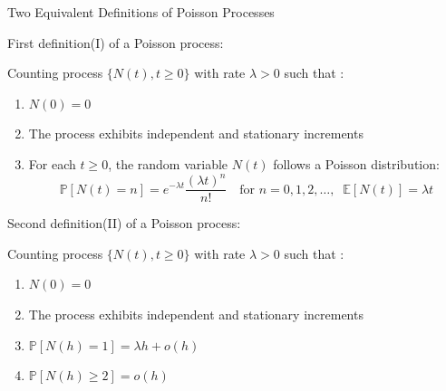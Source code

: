 \documentclass{beamer}
\begin{document}
\begin{frame}{Two Equivalent Definitions of Poisson Processes}

    {\footnotesize \footnotesize
    \par First definition(I) of a Poisson process:
    \par Counting process $\{N(t), t \geq 0\}$ with rate $\lambda > 0$ such that :
    \begin{enumerate}
        \item $N(0) = 0$  
        \item The process exhibits independent and stationary increments  
        \item For each $t\geq 0$, the random variable $N(t)$ follows a Poisson distribution:
        \[
        \mathbb{P}[N(t) = n] = e^{-\lambda t} \frac{(\lambda t)^n}{n!} \quad \text{for } n = 0, 1, 2, \ldots, \;\; \mathbb{E}[N(t)] = \lambda t
        \]
    \end{enumerate}\pause
    \par Second definition(II) of a Poisson process:
    \par Counting process $\{N(t), t \geq 0\}$ with rate $\lambda > 0$ such that :
    \begin{enumerate}
        \item $N(0) = 0$  
        \item The process exhibits independent and stationary increments
        \item $\mathbb{P}[N(h) = 1] = \lambda h + o(h)$
        \item $\mathbb{P}[N(h) \geq 2] = o(h)$
    \end{enumerate}
    }
\end{frame}
\end{document}
